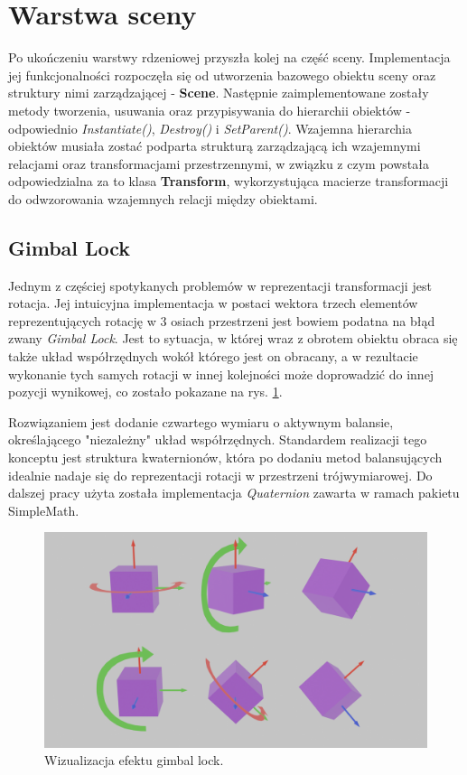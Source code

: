 \section{Warstwa sceny}
Po ukończeniu warstwy rdzeniowej przyszła kolej na część sceny. Implementacja jej funkcjonalności rozpoczęła się od utworzenia bazowego obiektu sceny oraz struktury nimi zarządzającej - \textbf{Scene}. Następnie zaimplementowane zostały metody tworzenia, usuwania oraz przypisywania do hierarchii obiektów - odpowiednio \textit{Instantiate()}, \textit{Destroy()} i \textit{SetParent()}. Wzajemna hierarchia obiektów musiała zostać podparta strukturą zarządzającą ich wzajemnymi relacjami oraz transformacjami przestrzennymi, w związku z czym powstała odpowiedzialna za to klasa \textbf{Transform}, wykorzystująca macierze transformacji do odwzorowania wzajemnych relacji między obiektami.

\subsection{Gimbal Lock}
Jednym z częściej spotykanych problemów w reprezentacji transformacji jest rotacja. Jej intuicyjna implementacja w postaci wektora trzech elementów reprezentujących rotację w 3 osiach przestrzeni jest bowiem podatna na błąd zwany \textit{Gimbal Lock}. Jest to sytuacja, w której wraz z obrotem obiektu obraca się także układ współrzędnych wokół którego jest on obracany, a w rezultacie wykonanie tych samych rotacji w innej kolejności może doprowadzić do innej pozycji wynikowej, co zostało pokazane na rys. \ref{GimbalLock}.

Rozwiązaniem jest dodanie czwartego wymiaru o aktywnym balansie, określającego "niezależny" układ współrzędnych. Standardem realizacji tego konceptu jest struktura kwaternionów, która po dodaniu metod balansujących idealnie nadaje się do reprezentacji rotacji w przestrzeni trójwymiarowej. Do dalszej pracy użyta została implementacja \textit{Quaternion} zawarta w ramach pakietu SimpleMath.

\begin{figure}
	\centering
	\includegraphics[width=\textwidth]{images/gimbal_lock.png}
	\caption{Wizualizacja efektu gimbal lock.}
	\label{GimbalLock}
\end{figure}

